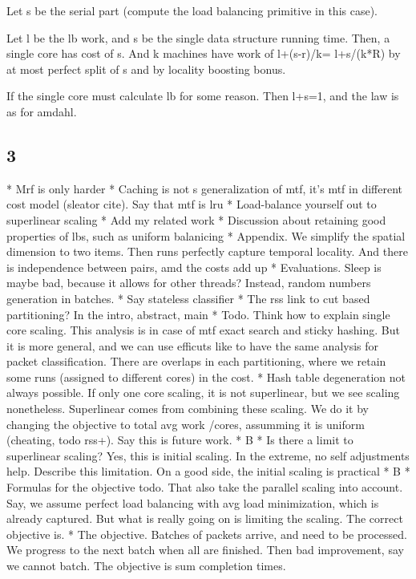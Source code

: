 Let s be the serial part (compute the load balancing primitive in this case).




Let l be the lb work, and s be the single data structure running time. Then, a single core has cost of s. And k machines have work of l+(s-r)/k= l+s/(k*R) by at most perfect split of s and by locality boosting bonus.

If the single core must calculate lb for some reason. Then l+s=1, and the law is as for amdahl.


\subsection{3}



* Mrf is only harder
* Caching is not s generalization of mtf, it's mtf in different cost model (sleator cite). Say that mtf is lru
* Load-balance yourself out to superlinear scaling
* Add my related work
* Discussion about retaining good properties of lbs, such as uniform balanicing
* Appendix. We simplify the spatial dimension to two items. Then runs perfectly capture temporal locality. And there is independence between pairs, amd the costs add up
* Evaluations. Sleep is maybe bad, because it allows for other threads? Instead, random numbers generation in batches.
* Say stateless classifier
* The rss link to cut based partitioning? In the intro, abstract, main
* Todo. Think how to explain single core scaling. This analysis is in case of mtf exact search and sticky hashing. But it is more general, and we can use efficuts like to have the same analysis for packet classification. There are overlaps in each partitioning, where we retain some runs (assigned to different cores) in the cost.
* Hash table degeneration not always possible. If only one core scaling, it is not superlinear, but we see scaling nonetheless. Superlinear comes from combining these scaling. We do it by changing the objective to total avg work /cores, assumming it is uniform (cheating, todo rss+). Say this is future work.
* B
* Is there a limit to superlinear scaling? Yes, this is initial scaling. In the extreme, no self adjustments help. Describe this limitation. On a good side, the initial scaling is practical
* B
* Formulas for the objective todo. That also take the parallel scaling into account. Say, we assume perfect load balancing with avg load minimization, which is already captured. But what is really going on is limiting the scaling. The correct objective is.
* The objective. Batches of packets arrive, and need to be processed. We progress to the next batch when all are finished. Then bad improvement, say we cannot batch. The objective is sum completion times.

